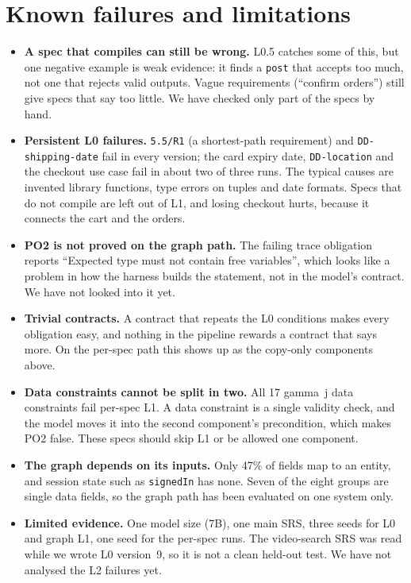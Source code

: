 \documentclass[10pt,a4paper]{article}
\newcommand{\code}[1]{\texttt{\small #1}}
\begin{document}
\section{Known failures and limitations}
\begin{itemize}
\item \textbf{A spec that compiles can still be wrong.} L0.5 catches some of this, but one negative example is weak evidence: it finds a \code{post} that accepts too much, not one that rejects valid outputs. Vague requirements (``confirm orders'') still give specs that say too little. We have checked only part of the specs by hand.
\item \textbf{Persistent L0 failures.} \code{5.5/R1} (a shortest-path requirement) and \code{DD-shipping-date} fail in every version; the card expiry date, \code{DD-location} and the checkout use case fail in about two of three runs. The typical causes are invented library functions, type errors on tuples and date formats. Specs that do not compile are left out of L1, and losing checkout hurts, because it connects the cart and the orders.
\item \textbf{PO2 is not proved on the graph path.} The failing trace obligation reports ``Expected type must not contain free variables'', which looks like a problem in how the harness builds the statement, not in the model's contract. We have not looked into it yet.
\item \textbf{Trivial contracts.} A contract that repeats the L0 conditions makes every obligation easy, and nothing in the pipeline rewards a contract that says more. On the per-spec path this shows up as the copy-only components above.
\item \textbf{Data constraints cannot be split in two.} All 17 gamma~j data constraints fail per-spec L1. A data constraint is a single validity check, and the model moves it into the second component's precondition, which makes PO2 false. These specs should skip L1 or be allowed one component.
\item \textbf{The graph depends on its inputs.} Only 47\% of fields map to an entity, and session state such as \code{signedIn} has none. Seven of the eight groups are single data fields, so the graph path has been evaluated on one system only.
\item \textbf{Limited evidence.} One model size (7B), one main SRS, three seeds for L0 and graph L1, one seed for the per-spec runs. The video-search SRS was read while we wrote L0 version~9, so it is not a clean held-out test. We have not analysed the L2 failures yet.
\end{itemize}
\end{document}
